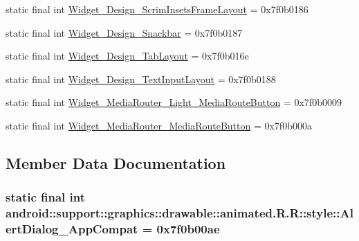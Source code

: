 \begin{CompactItemize}
\item 
static final int \hyperlink{classandroid_1_1support_1_1graphics_1_1drawable_1_1animated_1_1_r_1_1style_46d32c5444cd20822e639a25e2e0f0e5}{Widget\_\-Design\_\-ScrimInsetsFrameLayout} = 0x7f0b0186
\item 
static final int \hyperlink{classandroid_1_1support_1_1graphics_1_1drawable_1_1animated_1_1_r_1_1style_05621e9b76b65ee13ae8e01669d7de72}{Widget\_\-Design\_\-Snackbar} = 0x7f0b0187
\item 
static final int \hyperlink{classandroid_1_1support_1_1graphics_1_1drawable_1_1animated_1_1_r_1_1style_ee6966acfe2cb91d34cbc0df7c314491}{Widget\_\-Design\_\-TabLayout} = 0x7f0b016e
\item 
static final int \hyperlink{classandroid_1_1support_1_1graphics_1_1drawable_1_1animated_1_1_r_1_1style_3df432dca8b51cff578679589a31f6f8}{Widget\_\-Design\_\-TextInputLayout} = 0x7f0b0188
\item 
static final int \hyperlink{classandroid_1_1support_1_1graphics_1_1drawable_1_1animated_1_1_r_1_1style_ea1fd2156f87f87ffe279822fd70553c}{Widget\_\-MediaRouter\_\-Light\_\-MediaRouteButton} = 0x7f0b0009
\item 
static final int \hyperlink{classandroid_1_1support_1_1graphics_1_1drawable_1_1animated_1_1_r_1_1style_6901c7a514c5f235d17a2462973a6dbe}{Widget\_\-MediaRouter\_\-MediaRouteButton} = 0x7f0b000a
\end{CompactItemize}


\subsection{Member Data Documentation}
\hypertarget{classandroid_1_1support_1_1graphics_1_1drawable_1_1animated_1_1_r_1_1style_cf3cacb5bb72affefdf11610902d67ad}{
\subsubsection[{AlertDialog\_\-AppCompat}]{\setlength{\rightskip}{0pt plus 5cm}static final int android::support::graphics::drawable::animated.R.R::style::AlertDialog\_\-AppCompat = 0x7f0b00ae}}
\label{classandroid_1_1support_1_1graphics_1_1drawable_1_1animated_1_1_r_1_1style_cf3cacb5bb72affefdf11610902d67ad}


